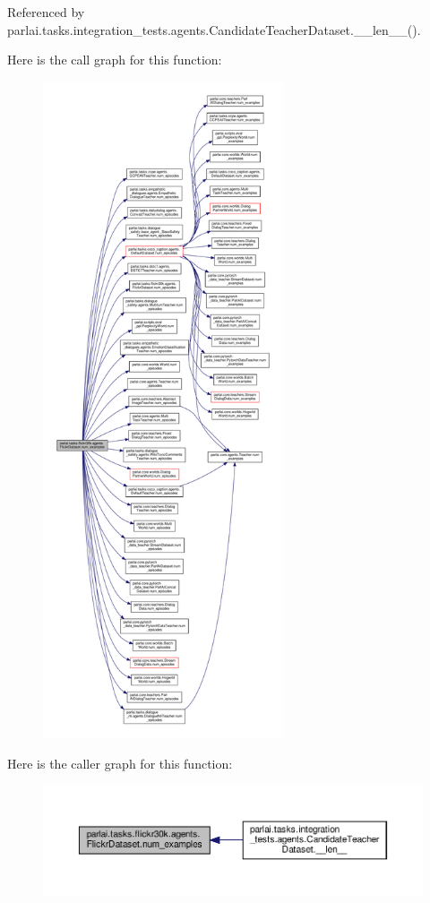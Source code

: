 Referenced by parlai.\+tasks.\+integration\+\_\+tests.\+agents.\+Candidate\+Teacher\+Dataset.\+\_\+\+\_\+len\+\_\+\+\_\+().

Here is the call graph for this function\+:
\nopagebreak
\begin{figure}[H]
\begin{center}
\leavevmode
\includegraphics[height=550pt]{classparlai_1_1tasks_1_1flickr30k_1_1agents_1_1FlickrDataset_ad3996cb0eb8a94dbea616391eedc1caa_cgraph}
\end{center}
\end{figure}
Here is the caller graph for this function\+:
\nopagebreak
\begin{figure}[H]
\begin{center}
\leavevmode
\includegraphics[width=350pt]{classparlai_1_1tasks_1_1flickr30k_1_1agents_1_1FlickrDataset_ad3996cb0eb8a94dbea616391eedc1caa_icgraph}
\end{center}
\end{figure}
